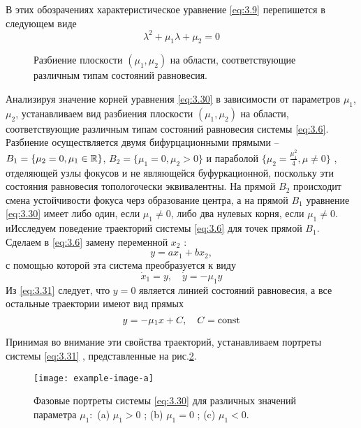 В этих обозрачениях характеристическое уравнение \eqref{eq:3.9} перепишется в следующем виде
\begin{equation}
        \label{eq:3.30}
       \lambda^2 + \mu_1 \lambda + \mu_2 =0 
\end{equation}
\begin{figure}[h!]
        \centering
        
        \label{fig:3.8}
        \caption{Разбиение плоскости $(\mu_1,\mu_2)$ на области, соответствующие различным типам состояний равновесия.}
\end{figure}
Анализируя значение корней уравнения \eqref{eq:3.30} в зависимости от параметров $\mu_1$, $\mu_2$, устанавливаем вид разбиения плоскости $( \mu_1, \mu_2)$ на области, соответствующие различным типам состояний равновесия системы \eqref{eq:3.6}. Разбиение осуществляется двумя бифурцационными прямыми --$B_1 = \{ \mu_2=0, \mu_1 \in \mathbb{R} \}$, $B_2=\{\mu_1=0, \mu_2>0\}$ и параболой $\{ \mu_2= \frac{\mu_1^2}{4}, \mu \neq 0 \}   $
, отделяющей узлы фокусов и не являющейся буфуркационной, поскольку эти состояния равновесия топологочески эквивалентны. На прямой $B_2$ происходит смена устойчивости фокуса черз образование центра, а на прямой $B_1$ уравнение \eqref{eq:3.30} имеет либо один, если $\mu_1 \neq 0$, либо два нулевых корня, если $\mu_1\neq 0$. иИсследуем поведение траекторий системы \eqref{eq:3.6} для точек прямой $B_1$. Сделаем в \eqref{eq:3.6} замену переменной $x_2$ :
\begin{equation}
        \label{eq:}
        y= ax_1 + bx_2,
\end{equation}
с помощью которой эта система преобразуется к виду
\begin{equation}
        \label{eq:3.31}
        \dot x_1 = y, \quad \dot y = - \mu_1 y  
\end{equation}
Из \eqref{eq:3.31} следует, что $y=0$ является линией состояний равновесия, а все остальные траектории имеют вид прямых
\begin{equation}
        \label{eq:}
        y= - \mu_1x +C, \quad C=\textrm{const}
\end{equation}

Принимая во внимание эти свойства траекторий, устанавливаем портреты системы \eqref{eq:3.31} , представленные на рис.\ref{fig:3.9}.
        
\begin{figure}[h!]
        \centering
        \texttt{[image: example-image-a]}
        \label{fig:3.9}
        \caption{Фазовые портреты системы \eqref{eq:3.30}  для различных значений параметра $\mu_1:$ 
        (a) $\mu_1>0$ ; (b) $\mu_1=0$ ; (c) $\mu_1<0$.}
\end{figure}
